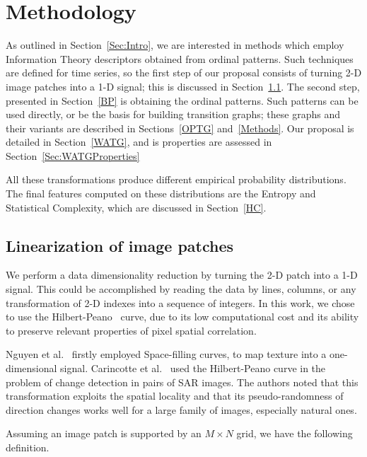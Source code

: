 \documentclass[journal]{IEEEtran}
\begin{document}
	\section{Methodology}\label{methodology}
	
	As outlined in Section~\ref{Sec:Intro}, we are interested in methods which employ Information Theory descriptors obtained from ordinal patterns.
	Such techniques are defined for time series, so the first step of our proposal consists of turning \mbox{2-D} image patches into a \mbox{1-D} signal; this is discussed in Section~\ref{linearization}.
	The second step, presented in Section~\ref{BP} is obtaining the ordinal patterns.
	Such patterns can be used directly, or be the basis for building transition graphs; these graphs and their variants are described in Sections~\ref{OPTG} and~\ref{Methods}.
	Our proposal is detailed in Section~\ref{WATG}, and is properties are assessed in Section~\ref{Sec:WATGProperties}
	
	All these transformations produce different empirical probability distributions.
	The final features computed on these distributions are the Entropy and Statistical Complexity, which are discussed in Section~\ref{HC}.
	
	
	\subsection{Linearization of image patches}\label{linearization}
	
	We perform a data dimensionality reduction by turning the \mbox{2-D} patch into a \mbox{1-D} signal.
	This could be accomplished by reading the data by lines, columns, or any transformation of \mbox{2-D} indexes into a sequence of integers.
	In this work, we chose to use the Hilbert-Peano~\cite{Lee1994Texture} curve, due to its low computational cost and its ability to preserve relevant properties of pixel spatial correlation.
	
	Nguyen et al.~\cite{nguyen1982space} firstly employed Space-filling curves, to map texture into a one-dimensional signal.
	Carincotte et al.~\cite{Carincotte2006changeDetection} used the Hilbert-Peano curve in the problem of change detection in pairs of SAR images.
	The authors noted that this transformation exploits the spatial locality and that its pseudo-randomness
	of direction changes works well for a large family of images, especially
	natural ones.
	
	Assuming an image patch is supported by an $M \times N$ grid, we have the following definition.
	
\end{document}
